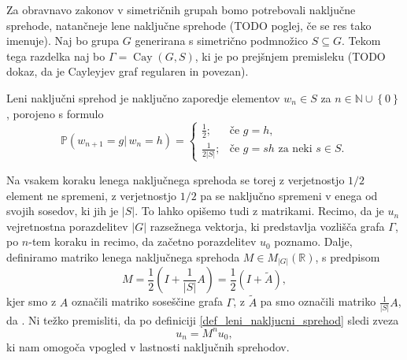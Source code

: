 \documentclass[mat1, tisk]{fmfdelo}
\numberwithin{equation}{section}  %
\begin{document}
Za obravnavo zakonov v simetričnih grupah bomo potrebovali naključne sprehode, natančneje lene naključne sprehode (TODO poglej, če se res tako imenuje).
Naj bo grupa $G$ generirana s simetrično podmnožico $S \subseteq G$. Tekom tega razdelka naj bo $\Gamma = \operatorname{Cay}(G, S)$, ki je po prejšnjem premisleku (TODO dokaz, da je Cayleyjev graf regularen in povezan).

\begin{definicija}
\label{def_leni_nakljucni_sprehod}
    Leni naključni sprehod je naključno zaporedje elementov $w_n \in S$ za $n \in \mathbb{N} \cup \left\{ 0\right\} $, porojeno s formulo \begin{equation*}
        \mathbb{P}(w_{n+1} = g   \vert \,  w_n = h) = \begin{cases}
            \frac{1}{2}; & \text{če }  g = h, \\
            \frac{1}{2 \lvert S \rvert }; & \text{če } g = sh \text{ za neki } s \in S.
        \end{cases}
    \end{equation*}  
\end{definicija}
Na vsakem koraku lenega naključnega sprehoda se torej z verjetnostjo $1 / 2$ element ne spremeni, z verjetnostjo $1 / 2$ pa se naključno spremeni v enega od svojih sosedov, ki jih je $\lvert S \rvert$.
To lahko opišemo tudi z matrikami. Recimo, da je $u_n$ vejretnostna porazdelitev $\lvert G \rvert$ razsežnega vektorja, ki predstavlja vozlišča grafa $\Gamma$, po $n$-tem koraku in recimo, da začetno porazdelitev $u_0$ poznamo. Dalje, definiramo matriko lenega naključnega sprehoda $M \in M_{\lvert G \rvert }(\mathbb{R})$, s predpisom    
\begin{equation*}
M = \frac{1}{2} \left(I + \frac{1}{\lvert S \rvert } A \right) = \frac{1}{2} (I + \tilde{A}),
\end{equation*}  
kjer smo z $A$ označili matriko soseščine grafa $\Gamma$, z $\tilde{A}$ pa smo označili matriko $\frac{1}{\lvert S \rvert} A$, da . Ni težko premisliti, da po definiciji \ref{def_leni_nakljucni_sprehod} sledi zveza 
\begin{equation*}
u_n = M^{n} u_0,
\end{equation*}  
ki nam omogoča vpogled v lastnosti naključnih sprehodov. 
\end{document}
